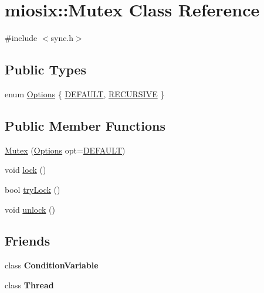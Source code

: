 \hypertarget{classmiosix_1_1_mutex}{\section{miosix\-:\-:Mutex Class Reference}
\label{classmiosix_1_1_mutex}
}


{\ttfamily \#include $<$sync.\-h$>$}

\subsection*{Public Types}
\begin{DoxyCompactItemize}
\item 
enum \hyperlink{classmiosix_1_1_mutex_acdb0fa35e637a14b1504a8f58c8bba2f}{Options} \{ \hyperlink{classmiosix_1_1_mutex_acdb0fa35e637a14b1504a8f58c8bba2fa84dda8357cdf60e9ce2b81c0f78c36d8}{D\-E\-F\-A\-U\-L\-T}, 
\hyperlink{classmiosix_1_1_mutex_acdb0fa35e637a14b1504a8f58c8bba2fadadaee3cc9d507680b8652a09c3de4a5}{R\-E\-C\-U\-R\-S\-I\-V\-E}
 \}
\end{DoxyCompactItemize}
\subsection*{Public Member Functions}
\begin{DoxyCompactItemize}
\item 
\hyperlink{classmiosix_1_1_mutex_a63a4d940d2bbb57522dcb23f0fc704a2}{Mutex} (\hyperlink{classmiosix_1_1_mutex_acdb0fa35e637a14b1504a8f58c8bba2f}{Options} opt=\hyperlink{classmiosix_1_1_mutex_acdb0fa35e637a14b1504a8f58c8bba2fa84dda8357cdf60e9ce2b81c0f78c36d8}{D\-E\-F\-A\-U\-L\-T})
\item 
void \hyperlink{classmiosix_1_1_mutex_a6ff0ea4734654c2048ef44cec62b5ed6}{lock} ()
\item 
bool \hyperlink{classmiosix_1_1_mutex_a3e7e51aa095528a36e49dd5f672ddc74}{try\-Lock} ()
\item 
void \hyperlink{classmiosix_1_1_mutex_a10974326b33d887fa7ad1f910b70ed50}{unlock} ()
\end{DoxyCompactItemize}
\subsection*{Friends}
\begin{DoxyCompactItemize}
\item 
\hypertarget{classmiosix_1_1_mutex_ab270e49e575fdf0fe1a4f2ee911df116}{class {\bfseries Condition\-Variable}}\label{classmiosix_1_1_mutex_ab270e49e575fdf0fe1a4f2ee911df116}

\item 
\hypertarget{classmiosix_1_1_mutex_adbc148eaddd341d7ae4d07c9e9e33bfd}{class {\bfseries Thread}}\label{classmiosix_1_1_mutex_adbc148eaddd341d7ae4d07c9e9e33bfd}

\end{DoxyCompactItemize}



